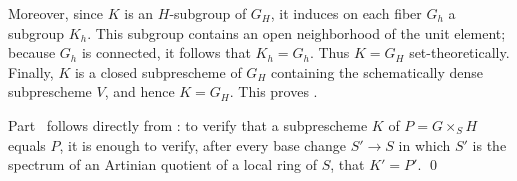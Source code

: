 Moreover, since \(K\) is an \(H\)-subgroup of \(G_H\), it induces on
each fiber \(G_h\) a subgroup \(K_h\). This subgroup contains an open
neighborhood of the unit element; because \(G_h\) is connected, it
follows that \(K_h=G_h\). Thus \(K=G_H\) set-theoretically. Finally,
\(K\) is a closed subprescheme of \(G_H\) containing the schematically
dense subprescheme \(V\), and hence \(K=G_H\). This proves .

Part~ follows directly from
: to verify that a subprescheme
\(K\) of \(P=G\times_SH\) equals \(P\), it is enough to verify, after
every base change \(S'\to S\) in which \(S'\) is the spectrum of an
Artinian quotient of a local ring of \(S\), that \(K'=P'\). \qed

